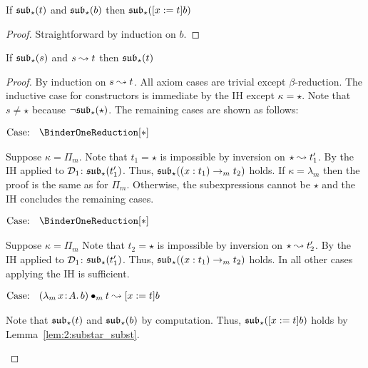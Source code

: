 \begin{lemma}
    If $\mathfrak{sub}_\star(t)$ and $\mathfrak{sub}_\star(b)$ then $\mathfrak{sub}_\star([x := t]b)$
    \label{lem:2:substar_subst}
\end{lemma}
\begin{proof}
    Straightforward by induction on $b$.
\end{proof}

\begin{lemma}
    If $\mathfrak{sub}_\star(s)$ and $s \leadsto t$ then $\mathfrak{sub}_\star(t)$
    \label{lem:2:substar_beta_step}
\end{lemma}
\begin{proof}
    By induction on $s \leadsto t$.
    All axiom cases are trivial except $\beta$-reduction.
    The inductive case for constructors is immediate by the IH except $\kappa = \star$.
    Note that $s \neq \star$ because $\neg \mathfrak{sub}_\star(\star)$.
    The remaining cases are shown as follows:

    $\text{Case: }\begin{array}{c} \BinderOneReduction[*] \end{array}$
    \begin{proofcase}
        Suppose $\kappa = \Pi_m$.
        Note that $t_1 = \star$ is impossible by inversion on $\star \leadsto t_1^\prime$.
        By the IH applied to $\mathcal{D}_{1}$: $\mathfrak{sub}_\star(t_1^\prime)$.
        Thus, $\mathfrak{sub}_\star((x : t_1) \to_m t_2)$ holds.
        If $\kappa = \lambda_m$ then the proof is the same as for $\Pi_m$.
        Otherwise, the subexpressions cannot be $\star$ and the IH concludes the remaining cases.
    \end{proofcase}

    $\text{Case: }\begin{array}{c} \BinderOneReduction[*] \end{array}$
    \begin{proofcase}
        Suppose $\kappa = \Pi_m$
        Note that $t_2 = \star$ is impossible by inversion on $\star \leadsto t_2^\prime$.
        By the IH applied to $\mathcal{D}_{1}$: $\mathfrak{sub}_\star(t_1^\prime)$.
        Thus, $\mathfrak{sub}_\star((x : t_1) \to_m t_2)$ holds.
        In all other cases applying the IH is sufficient.
    \end{proofcase}

    $\text{Case: }\begin{array}{c} ({\lambda_m}\, x\! : \! A.\, b) \bullet_{m} t \leadsto [x := t]b \end{array}$
    \begin{proofcase}
        Note that $\mathfrak{sub}_\star(t)$ and $\mathfrak{sub}_\star(b)$ by computation.
        Thus, $\mathfrak{sub}_\star([x := t]b)$ holds by Lemma~\ref{lem:2:substar_subst}.
    \end{proofcase}
\end{proof}

